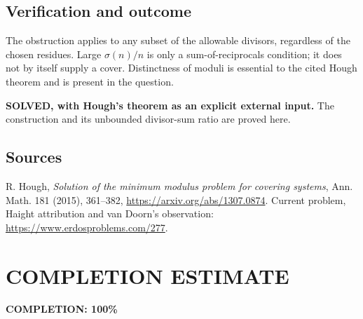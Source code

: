 \subsection{Verification and outcome}
The obstruction applies to any subset of the allowable divisors, regardless of the chosen residues. Large $\sigma(n)/n$ is only a sum-of-reciprocals condition; it does not by itself supply a cover. Distinctness of moduli is essential to the cited Hough theorem and is present in the question.

\textbf{SOLVED, with Hough's theorem as an explicit external input.} The construction and its unbounded divisor-sum ratio are proved here.

\subsection{Sources}
R. Hough, \emph{Solution of the minimum modulus problem for covering systems}, Ann. Math. 181 (2015), 361--382, \url{https://arxiv.org/abs/1307.0874}. Current problem, Haight attribution and van Doorn's observation: \url{https://www.erdosproblems.com/277}.
\section{COMPLETION ESTIMATE}
\textbf{COMPLETION: 100\%}
